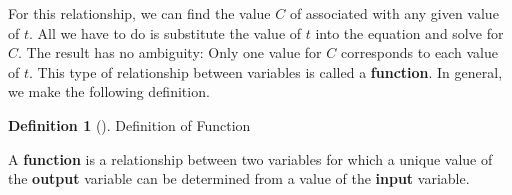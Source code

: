 \documentclass[10pt,]{book}
\newcommand{\terminology}[1]{\textbf{#1}}
\theoremstyle{plain}
\theoremstyle{definition}
\newtheorem{definition}[theorem]{Definition}
\theoremstyle{definition}
\theoremstyle{definition}
\theoremstyle{definition}
\theoremstyle{definition}
\numberwithin{equation}{section}
\begin{document}
    For this relationship, we can find the value \(C\) of associated with any given value of \(t\). All we have to do is substitute the value of \(t\) into the equation and solve for \(C\). The result has no ambiguity: Only one value for \(C\) corresponds to each value of \(t\). This type of relationship between variables is called a \terminology{function}. In general, we make the following definition.
%
\begin{definition}[]\label{definition-function}
Definition of Function%
\par
A \terminology{function} is a relationship between two variables for which a unique value of the \terminology{output} variable can be determined from a value of the \terminology{input} variable.
\end{definition}
\par
\end{document}
